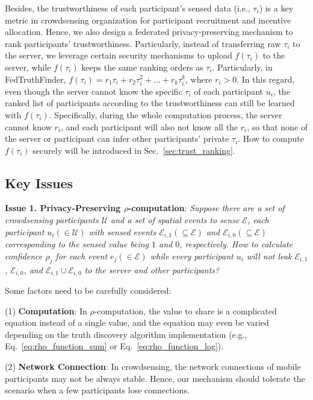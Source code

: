 Besides, the trustworthiness of each participant's sensed data (i.e., $\tau_i$) is a key metric in crowdsensing organization for participant recruitment and incentive allocation. Hence, we also design a federated privacy-preserving mechanism to rank participants' trustworthiness. Particularly, instead of transferring raw $\tau_i$ to the server, we leverage certain security mechanisms to upload $f(\tau_i)$ to the server, while $f(\tau_i)$ keeps the same ranking orders as $\tau_i$. Particularly, in FedTruthFinder, $f(\tau_i)=r_1\tau_i+r_2\tau_i^2+...+r_k\tau_i^k$, where $r_i>0$.  In this regard, even though the server cannot know the specific $\tau_i$ of each participant $u_i$, the ranked list of participants according to the trustworthiness can still be learned with $f(\tau_i)$. Specifically, during the whole computation process, the server cannot know $r_i$, and each participant will also not know all the $r_i$, so that none of the server or participant can infer other participants' private $\tau_i$. How to compute $f(\tau_i)$ securely will be introduced in Sec.~\ref{sec:trust_ranking}.

\subsection{Key Issues}

\textbf{Issue 1. Privacy-Preserving $\rho$-computation}: \textit{Suppose there are a set of crowdsensing participants $\mathcal U$ and a set of spatial events to sense $\mathcal E$, each participant $u_i (\in \mathcal U)$ with sensed events $\mathcal E_{i,1} (\subseteq \mathcal E)$ and $\mathcal E_{i,0} (\subseteq \mathcal E)$ corresponding to the sensed value being $1$ and $0$, respectively. How to calculate confidence $\rho_j$ for each event $e_j (\in \mathcal E)$ while every participant $u_i$ will not leak $\mathcal E_{i,1}$, $\mathcal E_{i,0}$, and $\mathcal E_{i,1} \cup \mathcal E_{i,0}$ to the server and other participants?}

Some factors need to be carefully considered:

(1) \textbf{Computation}: In $\rho$-computation, the value to share is a complicated equation instead of a single value, and the equation may even be varied depending on the truth discovery algorithm implementation (e.g., Eq.~\ref{eq:rho_function_sum} or Eq.~\ref{eq:rho_function_log}).

(2) \textbf{Network Connection}: In crowdsensing, the network connections of mobile participants may not be always stable. Hence, our mechanism should tolerate the scenario when a few participants lose connections.

